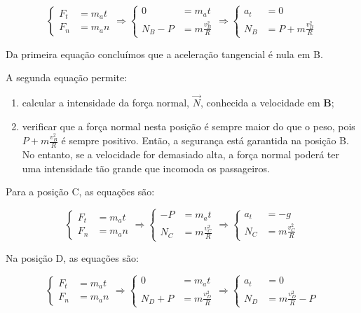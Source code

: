 \documentclass[a4paper,11pt,oneside]{report}
\begin{document}
\[
\left\{
\begin{array}{cl}
F_t & = m_at \\
F_n & = m_an
\end{array}
\right.
\Rightarrow
\left\{
\begin{array}{cl}
0 & = m_at \\
N_B - P & = m\frac{v_{B}^{2}}{R}
\end{array}
\right.
\Rightarrow
\left\{
\begin{array}{cl}
a_t & = 0 \\
N_B & = P + m\frac{v_{B}^{2}}{R}
\end{array}
\right.
\]

Da primeira equação concluímos que a aceleração tangencial é nula em B.

A segunda equação permite:

\begin{enumerate}
    \item calcular a intensidade da força normal, $\vec N$, conhecida a velocidade em \textbf{B};
    \item verificar que a força normal nesta posição é sempre maior do que o peso, pois $P + m\frac{v_{B}^{2}}{R}$ é sempre positivo. Então, a segurança está garantida na posição B. No entanto, se a velocidade for demasiado alta, a força normal poderá ter uma intensidade tão grande que incomoda os passageiros.
\end{enumerate}

Para a posição C, as equações são:

\[
\left\{
\begin{array}{cl}
F_t & = m_at \\
F_n & = m_an
\end{array}
\right.
\Rightarrow
\left\{
\begin{array}{cl}
-P & = m_at \\
N_C & = m\frac{v_{C}^{2}}{R}
\end{array}
\right.
\Rightarrow
\left\{
\begin{array}{cl}
a_t & = -g \\
N_C & = m\frac{v_{C}^{2}}{R}
\end{array}
\right.
\]

Na posição D, as equações são:

\[
\left\{
\begin{array}{cl}
F_t & = m_at \\
F_n & = m_an
\end{array}
\right.
\Rightarrow
\left\{
\begin{array}{cl}
0 & = m_at \\
N_D + P & = m\frac{v_{D}^{2}}{R}
\end{array}
\right.
\Rightarrow
\left\{
\begin{array}{cl}
a_t & = 0 \\
N_D & = m\frac{v_{D}^{2}}{R} - P
\end{array}
\right.
\]
\end{document}
